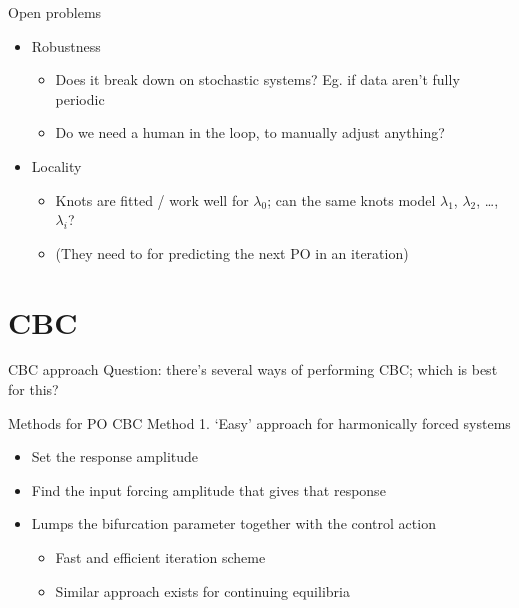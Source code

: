 \documentclass[presentation]{beamer}
\begin{document}
\begin{frame}[label={sec:org96a41ea}]{Open problems}
\begin{itemize}
\item Robustness
\begin{itemize}
\item Does it break down on stochastic systems? Eg. if data aren't fully periodic
\item Do we need a human in the loop, to manually adjust anything?
\end{itemize}
\end{itemize}
\vfill
\begin{itemize}
\item Locality
\begin{itemize}
\item Knots are fitted / work well for \(\lambda_0\); can the same knots model \(\lambda_1\), \(\lambda_2\), \dots{}, \(\lambda_i\)?
\item (They need to for predicting the next PO in an iteration)
\end{itemize}
\end{itemize}
\end{frame}

\section{CBC}
\label{sec:orgf6304a2}
\begin{frame}[label={sec:org281ac50}]{CBC approach}
Question: there's several ways of performing CBC; which is best for this?
\end{frame}

\begin{frame}[<+->][label={sec:org138bb97}]{Methods for PO CBC}
Method 1. `Easy' approach for harmonically forced systems
\vfill
\begin{itemize}
\item Set the response amplitude
\item Find the input forcing amplitude that gives that response
\item Lumps the bifurcation parameter together with the control action
\begin{itemize}
\item Fast and efficient iteration scheme
\item Similar approach exists for continuing equilibria
\end{itemize}
\end{itemize}
\end{frame}
\end{document}
